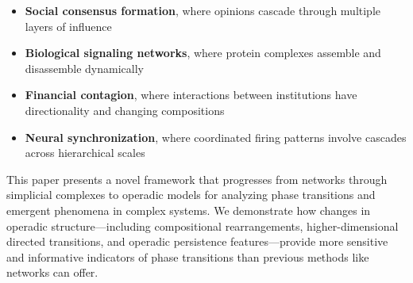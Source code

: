 \begin{itemize}[leftmargin=*]
  \item \textbf{Social consensus formation}, where opinions cascade through multiple layers of influence \citep{watts1998collective}
  \item \textbf{Biological signaling networks}, where protein complexes assemble and disassemble dynamically \citep{strogatz2001exploring, giovannoni2017dynamic}
  \item \textbf{Financial contagion}, where interactions between institutions have directionality and changing compositions \citep{farmer2009economy}
  \item \textbf{Neural synchronization}, where coordinated firing patterns involve cascades across hierarchical scales \citep{bar2008dynamics, linde2021operad}
\end{itemize}

This paper presents a novel framework that progresses from networks through simplicial complexes to operadic models for analyzing phase transitions and emergent phenomena in complex systems. We demonstrate how changes in operadic structure—including compositional rearrangements, higher-dimensional directed transitions, and operadic persistence features—provide more sensitive and informative indicators of phase transitions than previous methods like networks can offer.
